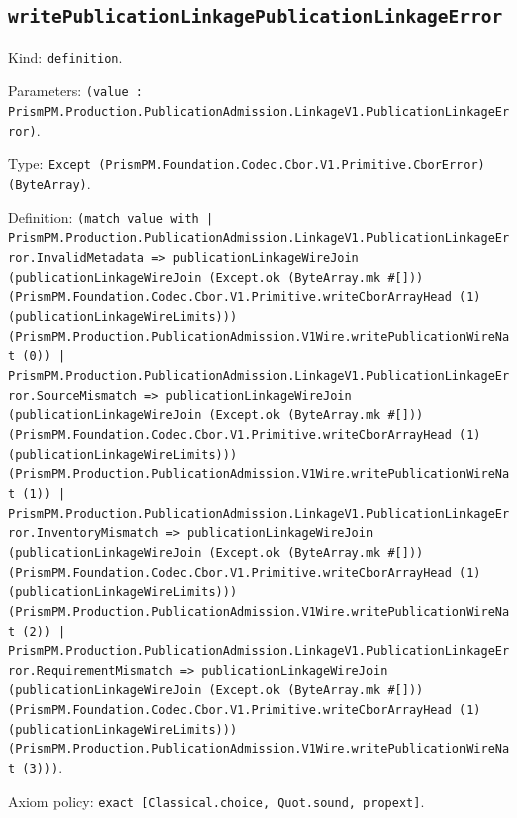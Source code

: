 \documentclass[11pt]{article}
\begin{document}
\subsection*{\texttt{writePublicationLinkagePublicationLinkageError}}
\noindent Kind: \texttt{definition}.\par
\noindent Parameters: \texttt{(value : PrismPM.Production.PublicationAdmission.LinkageV1.PublicationLinkageError)}.\par
\noindent Type: \texttt{Except (PrismPM.Foundation.Codec.Cbor.V1.Primitive.CborError) (ByteArray)}.\par
\noindent Definition: \texttt{(match value with | PrismPM.Production.PublicationAdmission.LinkageV1.PublicationLinkageError.InvalidMetadata => publicationLinkageWireJoin (publicationLinkageWireJoin (Except.ok (ByteArray.mk \#[])) (PrismPM.Foundation.Codec.Cbor.V1.Primitive.writeCborArrayHead (1) (publicationLinkageWireLimits))) (PrismPM.Production.PublicationAdmission.V1Wire.writePublicationWireNat (0)) | PrismPM.Production.PublicationAdmission.LinkageV1.PublicationLinkageError.SourceMismatch => publicationLinkageWireJoin (publicationLinkageWireJoin (Except.ok (ByteArray.mk \#[])) (PrismPM.Foundation.Codec.Cbor.V1.Primitive.writeCborArrayHead (1) (publicationLinkageWireLimits))) (PrismPM.Production.PublicationAdmission.V1Wire.writePublicationWireNat (1)) | PrismPM.Production.PublicationAdmission.LinkageV1.PublicationLinkageError.InventoryMismatch => publicationLinkageWireJoin (publicationLinkageWireJoin (Except.ok (ByteArray.mk \#[])) (PrismPM.Foundation.Codec.Cbor.V1.Primitive.writeCborArrayHead (1) (publicationLinkageWireLimits))) (PrismPM.Production.PublicationAdmission.V1Wire.writePublicationWireNat (2)) | PrismPM.Production.PublicationAdmission.LinkageV1.PublicationLinkageError.RequirementMismatch => publicationLinkageWireJoin (publicationLinkageWireJoin (Except.ok (ByteArray.mk \#[])) (PrismPM.Foundation.Codec.Cbor.V1.Primitive.writeCborArrayHead (1) (publicationLinkageWireLimits))) (PrismPM.Production.PublicationAdmission.V1Wire.writePublicationWireNat (3)))}.\par
\noindent Axiom policy: \texttt{exact [Classical.choice, Quot.sound, propext]}.\par
\end{document}

